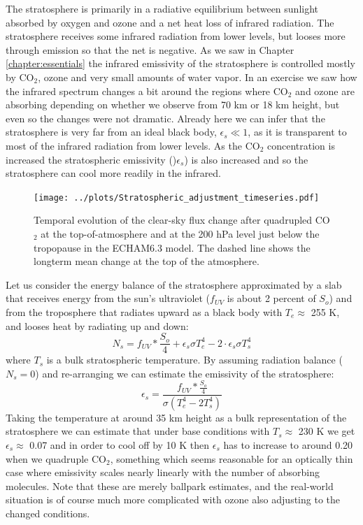 \documentclass[12pt]{book}
\begin{document}
The stratosphere is primarily in a radiative equilibrium between sunlight absorbed by oxygen and ozone and a net heat loss of infrared radiation. The stratosphere receives some infrared radiation from lower levels, but looses more through emission so that the net is negative.
As we saw in Chapter \ref{chapter:essentials} the infrared emissivity of the stratosphere is controlled mostly by CO$_2$, ozone and very small amounts of water vapor. In an exercise we saw how the infrared spectrum changes a bit around the regions where CO$_2$ and ozone are absorbing depending on whether we observe from 70 km or 18 km height, but even so the changes were not dramatic. Already here we can infer that the stratosphere is very far from an ideal black body, $\epsilon_s \ll 1$, as it is transparent to most of the infrared radiation from lower levels. 
As the CO$_2$ concentration is increased the stratospheric emissivity ()$\epsilon_s$) is also increased and so the stratosphere can cool more readily in the infrared. 

\begin{figure}
\begin{center}
\texttt{[image: ../plots/Stratospheric\_adjustment\_timeseries.pdf]}
\end{center}
\caption{ Temporal evolution of the clear-sky flux change after quadrupled CO$_2$ at the top-of-atmosphere and at the 200 hPa level just below the tropopause in the ECHAM6.3 model. The dashed line shows the longterm mean change at the top of the atmosphere. } 
\label{fig:stratospheric_adjustment_timeseries}
\end{figure}

Let us consider the energy balance of the stratosphere approximated by a slab that receives energy from the sun's ultraviolet ($f_{UV}$ is about 2 percent of $S_o$) and from the troposphere that radiates upward as a black body with $T_e\approx$ 255 K, and looses heat by radiating up and down:
$$ N_s = f_{UV}*\frac{S_o}{4} + \epsilon_s \sigma T_e^4 - 2\cdot \epsilon_s \sigma T_s^4 $$
where $T_s$ is a bulk stratospheric temperature. By assuming radiation balance ($N_s=0$) and re-arranging we can estimate the emissivity of the stratosphere:
$$ \epsilon_s = \frac{f_{UV}*\frac{S_o}{4}}{\sigma (T_e^4 - 2 T_s^4)} $$
Taking the temperature at around 35 km height as a bulk representation of the stratosphere we can estimate that under base conditions with $T_s\approx$ 230 K we get  $\epsilon_s \approx$ 0.07 and in order to cool off by 10 K then $\epsilon_s$ has to increase to around 0.20 when we quadruple CO$_2$, something which seems reasonable for an optically thin case where emissivity scales nearly linearly with the number of absorbing molecules. Note that these are merely ballpark estimates, and the real-world situation is of course much more complicated with ozone also adjusting to the changed conditions. 
\end{document}
